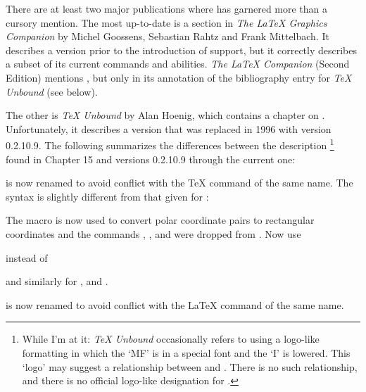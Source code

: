 \documentclass[letterpaper]{article}
\begin{document}
There are at least two major publications where \mfp{} has garnered more
than a cursory mention. The most up-to-date is a section in \textit{The
\LaTeX{} Graphics Companion} by Michel Goossens, Sebastian Rahtz and
Frank Mittelbach. It describes a version prior to the introduction of
\MP{} support, but it correctly describes a subset of its current
commands and abilities. \textit{The \LaTeX{} Companion} (Second Edition)
mentions \mfp{}, but only in its annotation of the bibliography entry
for \textit{\TeX{} Unbound} (see below).

The other is \textit{\TeX{} Unbound} by Alan Hoenig, which contains a
chapter on \mfp{}. Unfortunately, it describes a version that was
replaced in 1996 with version 0.2.10.9.  The following summarizes the
differences between the description%
    \footnote{While I'm at it: \textit{\TeX{} Unbound} occasionally
    refers to \mfp{} using a logo-like formatting in which the `MF' is
    in a special font and the `I' is lowered. This `logo' may suggest
    a relationship between \mfp{} and \PiCTeX{}. There is no such
    relationship, and there is no official logo-like designation for
    \mfp{}.} %
found in Chapter 15 and \mfp{} versions 0.2.10.9 through the
current one:

 is now renamed  to avoid conflict with the \TeX{}
command of the same name. The syntax is slightly different from that
given for :
\begin{ex}
\end{ex}

The macro  is now used to convert polar
coordinate pairs to rectangular coordinates and the commands
, ,  and  were
dropped from \mfp{}. Now use
\begin{ex}
\end{ex}
instead of
\begin{ex}
\end{ex}
and similarly for ,  and .

 is now renamed  to avoid conflict with the \LaTeX{}
command of the same name.
\end{document}
